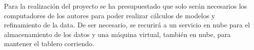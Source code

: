 
Para la realización del proyecto se ha presupuestado que solo serán necesarios los computadores de los autores para poder realizar cálculos de modelos y refinamiento de la data. De ser necesario, se recurirá a un servicio en nube para el almacenamiento de los datos y una máquina virtual, también en nube, para mantener el tablero corriendo. 